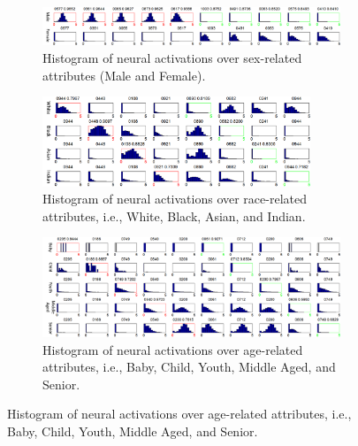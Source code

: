 \documentclass[10pt,twocolumn,letterpaper]{article}
\begin{document}
\begin{figure}[tb!]
\centering

\begin{subfigure}{0.98\textwidth}
\includegraphics[width = 0.98\textwidth]{picture/25a.png}
\vspace{-0.06in}
\caption{Histogram of neural activations over sex-related attributes (Male and Female).}
\label{fig:sex}
\vspace{0.05in}
\end{subfigure}

\begin{subfigure}{0.88\textwidth}
\includegraphics[width = 0.88\textwidth]{picture/25b.png}
\vspace{-0.06in}
\caption{Histogram of neural activations over race-related attributes, i.e., White, Black, Asian, and Indian.}
\label{fig:race}
\vspace{0.05in}
\end{subfigure}

\begin{subfigure}{0.98\textwidth}
\includegraphics[width = 0.98\textwidth]{picture/25c.png}
\vspace{-0.06in}
\caption{Histogram of neural activations over age-related attributes, i.e., Baby, Child, Youth, Middle Aged, and Senior.}
\label{fig:age}
\vspace{0.05in}
\end{subfigure}


\end{figure}
\end{document}
